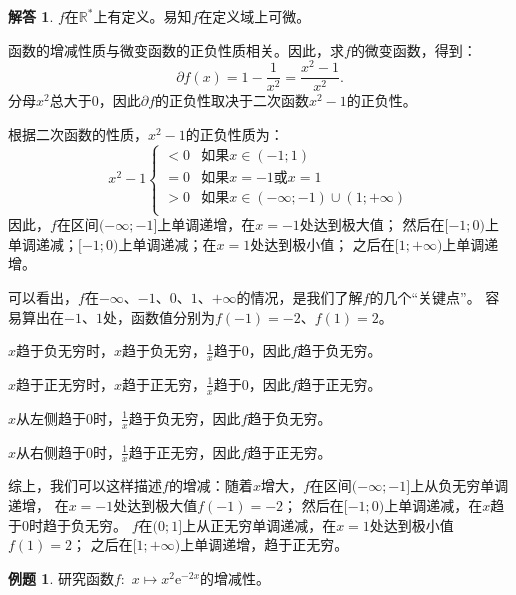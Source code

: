 \documentclass[12pt,UTF8]{ctexbook}
\theoremstyle{definition}
\newtheorem{et}{例题}[section]
\newtheorem*{so}{解答}
\theoremstyle{plain}
\begin{document}
\begin{so}
    $f$在$\mathbb{R}^*$上有定义。易知$f$在定义域上可微。

    函数的增减性质与微变函数的正负性质相关。因此，求$f$的微变函数，得到：
    $$ \partial f(x) = 1 - \frac{1}{x^2} = \frac{x^2 - 1}{x^2}.$$
    分母$ x^2 $总大于$0$，因此$ \partial f $的正负性取决于二次函数$x^2 - 1$的正负性。
    
    根据二次函数的性质，$x^2 - 1$的正负性质为：
    $$ x^2 - 1 \left\{
        \begin{array}{cl}
            < 0 & \mbox{如果}x \in (-1; 1) \\
            = 0 & \mbox{如果}x = -1 \mbox{或} x = 1 \\
            > 0 & \mbox{如果}x \in (-\infty; -1)\cup (1; +\infty)\\
        \end{array}\right.
    $$
    因此，$f$在区间$(-\infty; -1]$上单调递增，在$x = -1$处达到极大值；
    然后在$[-1; 0)$上单调递减；$[-1; 0)$上单调递减；在$x = 1$处达到极小值；
    之后在$[1; +\infty)$上单调递增。

    可以看出，$f$在$-\infty$、$-1$、$0$、$1$、$+\infty$的情况，是我们了解$f$的几个“关键点”。
    容易算出在$-1$、$1$处，函数值分别为$f(-1) = -2$、$f(1) = 2$。
    
    $x$趋于负无穷时，$x$趋于负无穷，$\frac{1}{x}$趋于$0$，因此$f$趋于负无穷。

    $x$趋于正无穷时，$x$趋于正无穷，$\frac{1}{x}$趋于$0$，因此$f$趋于正无穷。

    $x$从左侧趋于$0$时，$\frac{1}{x}$趋于负无穷，因此$f$趋于负无穷。
    
    $x$从右侧趋于$0$时，$\frac{1}{x}$趋于正无穷，因此$f$趋于正无穷。

    综上，我们可以这样描述$f$的增减：随着$x$增大，$f$在区间$(-\infty; -1]$上从负无穷单调递增，
    在$x = -1$处达到极大值$f(-1) = -2$；
    然后在$[-1; 0)$上单调递减，在$x$趋于$0$时趋于负无穷。
    $f$在$(0; 1]$上从正无穷单调递减，在$x = 1$处达到极小值$f(1) = 2$；
    之后在$[1; +\infty)$上单调递增，趋于正无穷。
\end{so}

\begin{et}
    研究函数$f:\,\,x\mapsto x^2 \mathrm{e}^{-2x}$的增减性。
\end{et}
\end{document}

